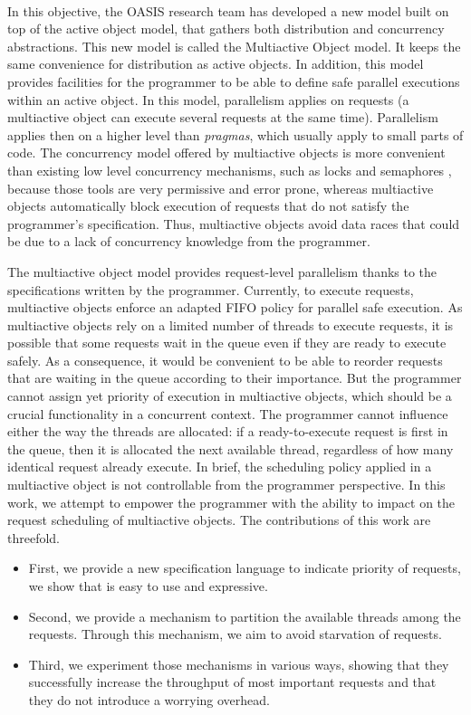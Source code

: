 \documentclass[11pt]{report}
\begin{document}
\paragraph{}
In this objective, the OASIS research team has developed a new model built on top of the active object model, that gathers both distribution and concurrency abstractions. This new model is called the Multiactive Object model. It keeps the same convenience for distribution as active objects. In addition, this model provides facilities for the programmer to be able to define safe parallel executions within an active object. In this model, parallelism applies on requests (a multiactive object can execute several requests at the same time). Parallelism applies then on a higher level than \emph{pragmas}, which usually apply to small parts of code. The concurrency model offered by multiactive objects is more convenient than existing low level concurrency mechanisms, such as locks and semaphores \cite{ref:semaphore},
because those tools are very permissive and error prone, whereas multiactive objects automatically block execution of requests that do not satisfy the programmer's specification.
Thus, multiactive objects avoid data races that could be due to a lack of concurrency knowledge from the programmer.

The multiactive object model provides request-level parallelism thanks to the specifications written by the programmer.
Currently, to execute requests, multiactive objects enforce an adapted FIFO policy for parallel safe execution. As multiactive objects rely on a limited number of threads to execute requests, it is possible that some requests wait in the queue even if they are ready to execute safely.
As a consequence, it would be convenient to be able to reorder requests that are waiting in the queue according to their importance. But the programmer cannot assign yet priority of execution in multiactive objects, which should be a crucial functionality in a concurrent context. The programmer cannot influence either the way the threads are allocated: if a ready-to-execute request is first in the queue, then it is allocated the next available thread, regardless of how many identical request already execute. In brief, the scheduling policy applied in a multiactive object is not controllable from the programmer perspective. In this work, we attempt to empower the programmer with the ability to impact on the request scheduling of multiactive objects. The contributions of this work are  threefold. 

\begin{itemize}
\item First, we  provide a new specification language to indicate priority of requests, we show that is easy to use and expressive.
\item Second, we provide a mechanism to partition the available threads among the requests. Through this mechanism, we aim to avoid starvation of requests.
\item Third, we experiment those mechanisms in various ways, showing that they successfully increase the throughput of most important requests and that they do not introduce a worrying overhead.
\end{itemize}
\end{document}

